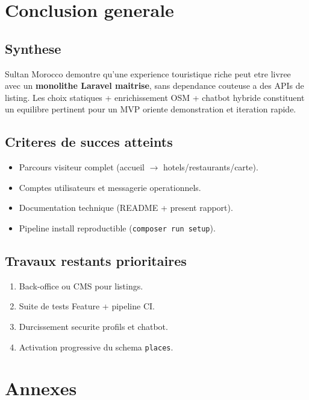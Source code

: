 \chapter{Conclusion generale}
\label{ch:conclusion}

\section{Synthese}

Sultan Morocco demontre qu'une experience touristique riche peut etre livree avec un \textbf{monolithe Laravel maitrise}, sans dependance couteuse a des APIs de listing. Les choix statiques + enrichissement OSM + chatbot hybride constituent un equilibre pertinent pour un MVP oriente demonstration et iteration rapide.

\section{Criteres de succes atteints}

\begin{itemize}
  \item Parcours visiteur complet (accueil $\rightarrow$ hotels/restaurants/carte).
  \item Comptes utilisateurs et messagerie operationnels.
  \item Documentation technique (README + present rapport).
  \item Pipeline install reproductible (\texttt{composer run setup}).
\end{itemize}

\section{Travaux restants prioritaires}

\begin{enumerate}
  \item Back-office ou CMS pour listings.
  \item Suite de tests Feature + pipeline CI.
  \item Durcissement securite profils et chatbot.
  \item Activation progressive du schema \texttt{places}.
\end{enumerate}

\chapter*{Annexes}

